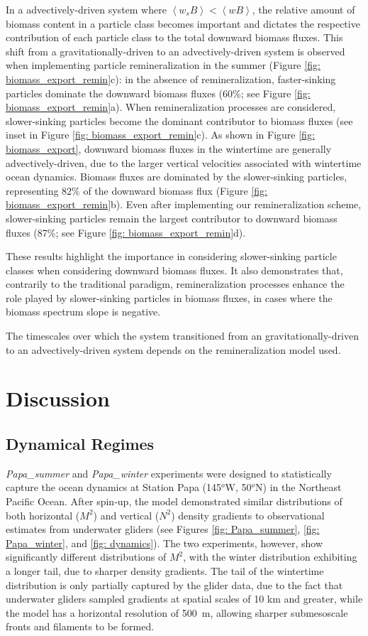 \documentclass[article,linenumbers]{agujournal2018}
\begin{document}
In a advectively-driven system where $\left<w_sB\right> < \left<wB\right>$, the relative amount of biomass content in a particle class becomes important and dictates the respective contribution of each particle class to the total downward biomass fluxes. This shift from a gravitationally-driven to an advectively-driven system is observed when implementing particle remineralization in the summer (Figure \ref{fig: biomass_export_remin}c): in the absence of remineralization, faster-sinking particles dominate the downward biomass fluxes (60\%; see Figure \ref{fig: biomass_export_remin}a). When remineralization processes are considered, slower-sinking particles become the dominant contributor to biomass fluxes (see inset in Figure \ref{fig: biomass_export_remin}c). As shown in Figure \ref{fig: biomass_export}, downward biomass fluxes in the wintertime are generally advectively-driven, due to the larger vertical velocities associated with wintertime ocean dynamics. Biomass fluxes are dominated by the slower-sinking particles, representing 82\% of the downward biomass flux (Figure \ref{fig: biomass_export_remin}b). Even after implementing our remineralization scheme, slower-sinking particles remain the largest contributor to downward biomass fluxes (87\%; see Figure \ref{fig: biomass_export_remin}d).
 
These results highlight the importance in considering slower-sinking particle classes when considering downward biomass fluxes. It also demonstrates that, contrarily to the traditional paradigm, remineralization processes enhance the role played by slower-sinking particles in biomass fluxes, in cases where the biomass spectrum slope is negative. 
 
The timescales over which the system transitioned from an gravitationally-driven to an advectively-driven system depends on the remineralization model used. 

\section{Discussion}
\label{sec: Discussion}

\subsection{Dynamical Regimes}
\label{sec: Discussion_model}
\textit{Papa\_summer} and \textit{Papa\_winter} experiments were designed to statistically capture the ocean dynamics at Station Papa (145$^o$W, 50$^o$N) in the Northeast Pacific Ocean. After spin-up, the model demonstrated similar distributions of both horizontal ($M^2$) and vertical ($N^2$) density gradients to observational estimates from underwater gliders (see Figures \ref{fig: Papa_summer}, \ref{fig: Papa_winter}, and \ref{fig: dynamics}). The two experiments, however, show significantly different distributions of $M^2$, with the winter distribution exhibiting a longer tail, due to sharper density gradients. The tail of the wintertime distribution is only partially captured by the glider data, due to the fact that underwater gliders sampled gradients at spatial scales of 10 km and greater, while the model has a horizontal resolution of 500~m, allowing sharper submesoscale fronts and filaments to be formed.
\end{document}
